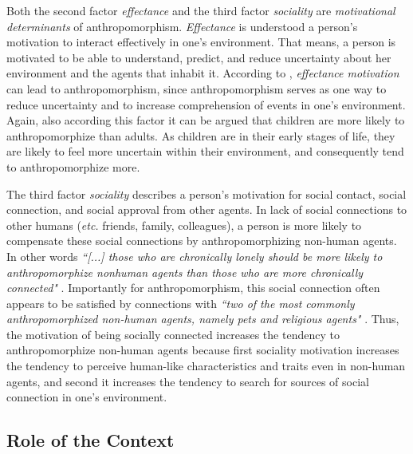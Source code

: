 \documentclass{frontiersSCNS} %
\newcommand{\etc}{\textit{etc.}\xspace}
\begin{document}
Both the second factor \textit{effectance} and the third factor
\textit{sociality} are \emph{motivational determinants} of anthropomorphism.
\textit{Effectance} is understood a person's motivation to interact effectively
in one's environment. That means, a person is motivated to be able to
understand, predict, and reduce uncertainty about her environment and the agents
that inhabit it. According to \cite{epley_seeing_2007}, \textit{effectance
motivation} can lead to anthropomorphism, since anthropomorphism serves as one
way to reduce uncertainty and to increase comprehension of events in one's
environment. Again, also according this factor it can be argued that children
are more likely to anthropomorphize than adults. As children are in their early
stages of life, they are likely to feel more uncertain within their environment,
and consequently tend to anthropomorphize more.

The third factor \textit{sociality} describes a person's motivation for social
contact, social connection, and social approval from other agents. In lack of
social connections to other humans (\etc friends, family, colleagues), a person
is more likely to compensate these social connections by anthropomorphizing
non-human agents. In other words \textit{``[...] those who are chronically
lonely should be more likely to anthropomorphize nonhuman agents than those who
are more chronically connected"} \citep{epley_seeing_2007}. Importantly for
anthropomorphism, this social connection often appears to be satisfied by
connections with \textit{``two of the most commonly anthropomorphized non-human
agents, namely pets and religious agents"} \citep{epley_seeing_2007}. Thus, the
motivation of being socially connected increases the tendency to
anthropomorphize non-human agents because first sociality motivation increases
the tendency to perceive human-like characteristics and traits even in non-human
agents, and second it increases the tendency to search for sources of social
connection in one's environment.

%
%
%
%
%
%


\subsection{Role of the Context}
\end{document}

